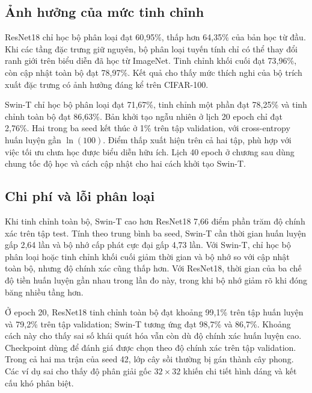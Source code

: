 \subsection{Ảnh hưởng của mức tinh chỉnh}

ResNet18 chỉ học bộ phân loại đạt 60,95\%, thấp hơn 64,35\% của bản học từ đầu. Khi các tầng đặc trưng giữ nguyên, bộ phân loại tuyến tính chỉ có thể thay đổi ranh giới trên biểu diễn đã học từ ImageNet. Tinh chỉnh khối cuối đạt 73,96\%, còn cập nhật toàn bộ đạt 78,97\%. Kết quả cho thấy mức thích nghi của bộ trích xuất đặc trưng có ảnh hưởng đáng kể trên CIFAR-100.

Swin-T chỉ học bộ phân loại đạt 71,67\%, tinh chỉnh một phần đạt 78,25\% và tinh chỉnh toàn bộ đạt 86,63\%. Bản khởi tạo ngẫu nhiên ở lịch 20 epoch chỉ đạt 2,76\%. Hai trong ba seed kết thúc ở 1\% trên tập validation, với cross-entropy huấn luyện gần $\ln(100)$. Điểm thấp xuất hiện trên cả hai tập, phù hợp với việc tối ưu chưa học được biểu diễn hữu ích. Lịch 40 epoch ở chương sau dùng chung tốc độ học và cách cập nhật cho hai cách khởi tạo Swin-T.

\subsection{Chi phí và lỗi phân loại}

Khi tinh chỉnh toàn bộ, Swin-T cao hơn ResNet18 7,66 điểm phần trăm độ chính xác trên tập test. Tính theo trung bình ba seed, Swin-T cần thời gian huấn luyện gấp 2,64 lần và bộ nhớ cấp phát cực đại gấp 4,73 lần. Với Swin-T, chỉ học bộ phân loại hoặc tinh chỉnh khối cuối giảm thời gian và bộ nhớ so với cập nhật toàn bộ, nhưng độ chính xác cũng thấp hơn. Với ResNet18, thời gian của ba chế độ tiền huấn luyện gần nhau trong lần đo này, trong khi bộ nhớ giảm rõ khi đóng băng nhiều tầng hơn.

Ở epoch 20, ResNet18 tinh chỉnh toàn bộ đạt khoảng 99,1\% trên tập huấn luyện và 79,2\% trên tập validation; Swin-T tương ứng đạt 98,7\% và 86,7\%. Khoảng cách này cho thấy sai số khái quát hóa vẫn còn dù độ chính xác huấn luyện cao. Checkpoint dùng để đánh giá được chọn theo độ chính xác trên tập validation. Trong cả hai ma trận của seed 42, lớp cây sồi thường bị gán thành cây phong. Các ví dụ sai cho thấy độ phân giải gốc $32\times32$ khiến chi tiết hình dáng và kết cấu khó phân biệt.
